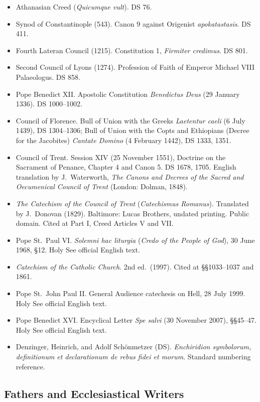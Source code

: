 \begin{itemize}
\item Athanasian Creed (\textit{Quicumque vult}). DS 76.
\item Synod of Constantinople (543). Canon 9 against Origenist \textit{apokatastasis}. DS 411.
\item Fourth Lateran Council (1215). Constitution 1, \textit{Firmiter credimus}. DS 801.
\item Second Council of Lyons (1274). Profession of Faith of Emperor Michael VIII Palaeologus. DS 858.
\item Pope Benedict XII. Apostolic Constitution \textit{Benedictus Deus} (29 January 1336). DS 1000--1002.
\item Council of Florence. Bull of Union with the Greeks \textit{Laetentur caeli} (6 July 1439), DS 1304--1306; Bull of Union with the Copts and Ethiopians (Decree for the Jacobites) \textit{Cantate Domino} (4 February 1442), DS 1333, 1351.
\item Council of Trent. Session XIV (25 November 1551), Doctrine on the Sacrament of Penance, Chapter 4 and Canon 5. DS 1678, 1705. English translation by J.\ Waterworth, \textit{The Canons and Decrees of the Sacred and Oecumenical Council of Trent} (London: Dolman, 1848).
\item \textit{The Catechism of the Council of Trent} (\textit{Catechismus Romanus}). Translated by J.\ Donovan (1829). Baltimore: Lucas Brothers, undated printing. Public domain. Cited at Part I, Creed Articles V and VII.
\item Pope St.\ Paul VI. \textit{Solemni hac liturgia} (\textit{Credo of the People of God}), 30 June 1968, \S 12. Holy See official English text.
\item \textit{Catechism of the Catholic Church}. 2nd ed.\ (1997). Cited at \S\S 1033--1037 and 1861.
\item Pope St.\ John Paul II. General Audience catechesis on Hell, 28 July 1999. Holy See official English text.
\item Pope Benedict XVI. Encyclical Letter \textit{Spe salvi} (30 November 2007), \S\S 45--47. Holy See official English text.
\item Denzinger, Heinrich, and Adolf Sch\"{o}nmetzer (DS). \textit{Enchiridion symbolorum, definitionum et declarationum de rebus fidei et morum}. Standard numbering reference.
\end{itemize}

\subsection*{Fathers and Ecclesiastical Writers}

